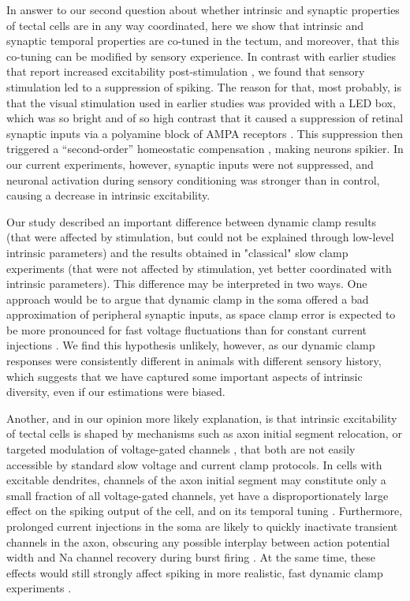 \documentclass{article}
\begin{document}
In answer to our second question about whether intrinsic and synaptic properties of tectal cells are in any way coordinated, here we show that intrinsic and synaptic temporal properties are co-tuned in the tectum, and moreover, that this co-tuning can be modified by sensory experience. In contrast with earlier studies that report increased excitability post-stimulation \citep{aizenman2003,dong2009,ciarleglio2015}, we found that sensory stimulation led to a suppression of spiking. The reason for that, most probably, is that the visual stimulation used in earlier studies was provided with a LED box, which was so bright and of so high contrast that it caused a suppression of retinal synaptic inputs via a polyamine block of AMPA receptors \citep{aizenman2003}. This suppression then triggered a “second-order” homeostatic compensation \citep{turrigiano2011,tien2018}, making neurons spikier. In our current experiments, however, synaptic inputs were not suppressed, and neuronal activation during sensory conditioning was stronger than in control, causing a decrease in intrinsic excitability.

Our study described an important difference between dynamic clamp results (that were affected by stimulation, but could not be explained through low-level intrinsic parameters) and the results obtained in "classical" slow clamp experiments (that were not affected by stimulation, yet better coordinated with intrinsic parameters). This difference may be interpreted in two ways. One approach would be to argue that dynamic clamp in the soma offered a bad approximation of peripheral synaptic inputs, as space clamp error is expected to be more pronounced for fast voltage fluctuations than for constant current injections \citep{spruston1993,prinz2004}. We find this hypothesis unlikely, however, as our dynamic clamp responses were consistently different in animals with different sensory history, which suggests that we have captured some important aspects of intrinsic diversity, even if our estimations were biased. 

Another, and in our opinion more likely explanation, is that intrinsic excitability of tectal cells is shaped by mechanisms such as axon initial segment relocation, or targeted modulation of voltage-gated channels \citep{grubb2010activity, kole2012}, that both are not easily accessible by standard slow voltage and current clamp protocols. In cells with excitable dendrites, channels of the axon initial segment may constitute only a small fraction of all voltage-gated channels, yet have a disproportionately large effect on the spiking output of the cell, and on its temporal tuning \citep{kole2007,hamada2016}. Furthermore, prolonged current injections in the soma are likely to quickly inactivate transient channels in the axon, obscuring any possible interplay between action potential width and Na channel recovery during burst firing \citep{popovic2011,kole2012,fontaine2014threshold}. At the same time, these effects would still strongly affect spiking in more realistic, fast dynamic clamp experiments \citep{clay2012optimal,zbili2019axonnav}.
\end{document}
